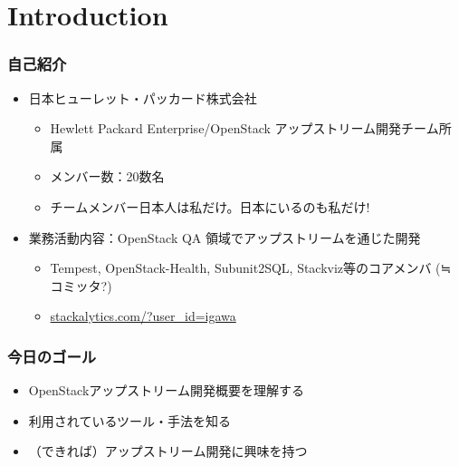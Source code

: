 \documentclass[aspectratio=169,11pt,hyperref={colorlinks=true}]{beamer}
\begin{document}
\section{Introduction}
\begin{frame}
  \frametitle{自己紹介}
  \begin{itemize}
    \item 日本ヒューレット・パッカード株式会社
      \begin{itemize}
        \item Hewlett Packard Enterprise/OpenStack アップストリーム開発チーム所属
        \item メンバー数：20数名
        \item チームメンバー日本人は私だけ。日本にいるのも私だけ!
      \end{itemize}
    \item 業務活動内容：OpenStack QA 領域でアップストリームを通じた開発
      \begin{itemize}
        \item Tempest, OpenStack-Health, Subunit2SQL, Stackviz等のコアメンバ (≒ コミッタ?)
        \item \href{http://stackalytics.com/?user_id=igawa&release=all&metric=all}{stackalytics.com/?user\_id=igawa}
      \end{itemize}
  \end{itemize}
\end{frame}

\begin{frame}
  \frametitle{今日のゴール}
  \begin{itemize}
    \item OpenStackアップストリーム開発概要を理解する
    \item 利用されているツール・手法を知る
    \item （できれば）アップストリーム開発に興味を持つ
  \end{itemize}
\end{frame}
\end{document}
